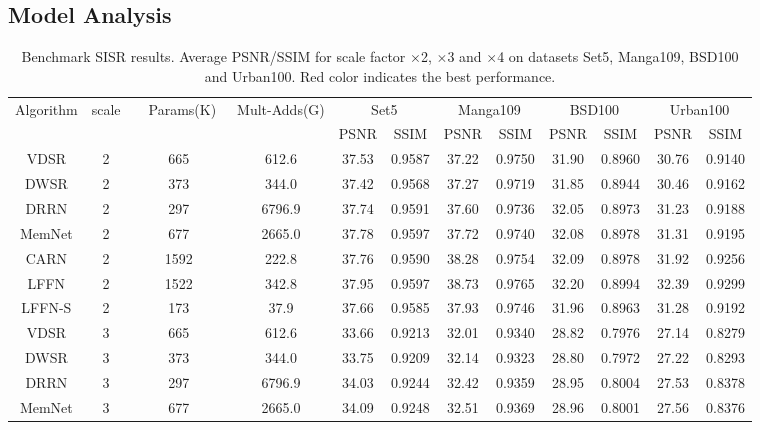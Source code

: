 \documentclass[journal]{IEEEtran}
\begin{document}
\subsection{Model Analysis}
\renewcommand\arraystretch{1}
\begin{table*}[!ht]
\centering
\caption{\small Benchmark SISR results. Average PSNR/SSIM for scale factor $\times$2, $\times$3 and $\times$4 on datasets  Set5, Manga109, BSD100 and Urban100. Red color indicates the best performance.}
\begin{tabular}{|c|c|c|c|cc|cc|cc|cc|}
\hline
    \multirow{2}[2]{*}{Algorithm} & \multirow{2}[2]{*}{scale} & \multirow{2}[2]{*}{ {\ \ Params(K)\ }} & \multirow{2}[2]{*}{Mult-Adds(G)} & \multicolumn{2}{c|}{Set5} & \multicolumn{2}{c|}{Manga109} & \multicolumn{2}{c|}{BSD100} & \multicolumn{2}{c|}{Urban100} \\
          &       &       &       & PSNR  & SSIM  & PSNR  & SSIM  & PSNR  & SSIM  & PSNR  & SSIM \\
\hline
\hline
VDSR \cite{Kim2016Accurate}& 2 & 665 & 612.6 & 37.53& 0.9587& 37.22& 0.9750& 31.90& 0.8960& 30.76& 0.9140\\
DWSR \cite{guo2017deep}& 2 & 373 & 344.0 & 37.42& 0.9568& 37.27 & 0.9719 & 31.85& 0.8944& 30.46& 0.9162\\
DRRN \cite{tai2017image}& 2 & 297 & 6796.9 & 37.74& 0.9591& 37.60& 0.9736& 32.05& 0.8973& 31.23& 0.9188\\
MemNet \cite{tai2017memnet}& 2 & 677 & 2665.0 & 37.78& 0.9597& 37.72& 0.9740& 32.08& 0.8978& 31.31& 0.9195\\
CARN \cite{ahn2018fast}& 2 & 1592 & 222.8 & 37.76& 0.9590& 38.28& 0.9754& 32.09&0.8978& 31.92&  0.9256\\
LFFN & 2 & 1522 & 342.8 & \color{red}37.95&\color{red} 0.9597&\color{red} 38.73& \color{red}0.9765&\color{red} 32.20& \color{red}0.8994& \color{red}32.39&\color{red}0.9299\\
LFFN-S & 2 & 173 & 37.9 & 37.66& 0.9585&37.93& 0.9746& 31.96& 0.8963& 31.28& 0.9192\\
\hline
\hline
VDSR \cite{Kim2016Accurate}& 3 & 665 & 612.6 & 33.66& 0.9213& 32.01& 0.9340& 28.82& 0.7976& 27.14& 0.8279\\
DWSR \cite{guo2017deep}& 3 & 373 & 344.0 & 33.75& 0.9209& 32.14 & 0.9323 & 28.80& 0.7972& 27.22& 0.8293\\
DRRN \cite{tai2017image}&3 & 297 & 6796.9 & 34.03& 0.9244&32.42& 0.9359& 28.95& 0.8004& 27.53& 0.8378\\
MemNet \cite{tai2017memnet}&3 & 677 & 2665.0 & 34.09& 0.9248& 32.51& 0.9369& 28.96& 0.8001& 27.56& 0.8376\\

\end{tabular}
\end{table*}
\end{document}
